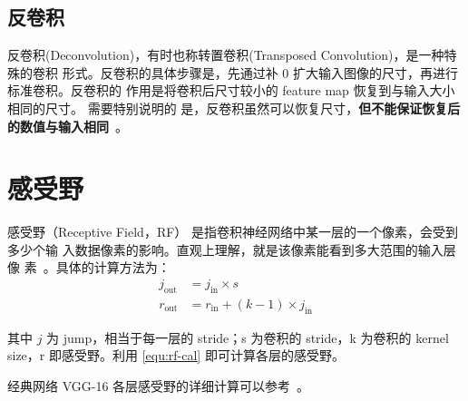 \subsection{反卷积}

反卷积(Deconvolution)，有时也称转置卷积(Transposed Convolution)，是一种特殊的卷积
形式。反卷积的具体步骤是，先通过补 0 扩大输入图像的尺寸，再进行标准卷积。反卷积的
作用是将卷积后尺寸较小的 feature map 恢复到与输入大小相同的尺寸。 需要特别说明的
是，反卷积虽然可以恢复尺寸，\textbf{但不能保证恢复后的数值与输入相同}~。

\section{感受野}

感受野（Receptive Field，RF） 是指卷积神经网络中某一层的一个像素，会受到多少个输
入数据像素的影响。直观上理解，就是该像素能看到多大范围的输入层像
素~。具体的计算方法为：
\begin{align}
\label{equ:rf-cal}
j_{\mathrm {out}} & = j_{\mathrm{in}} \times s \\
r_{\mathrm {out}} & = r_{\mathrm{in}} + (k-1) \times j_{\mathrm{in}}
\end{align}

其中 $j$ 为 jump，相当于每一层的 stride；s 为卷积的 stride，k 为卷积的 kernel
size，r 即感受野。利用 \eqref{equ:rf-cal} 即可计算各层的感受野。

经典网络 VGG-16 各层感受野的详细计算可以参考~。

